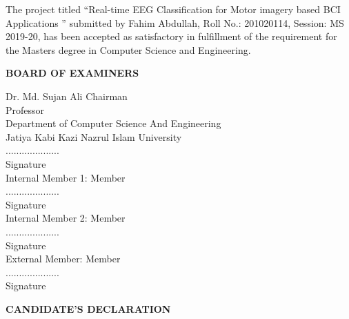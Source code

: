 \documentclass[12pt,a4paper]{report}
\begin{document}
	\onehalfspacing
	\justify The project titled “Real-time EEG Classification for Motor imagery based BCI Applications ” submitted by Fahim Abdullah, Roll No.: 201020114, Session: MS 2019-20, has been accepted as satisfactory in fulfillment of the requirement for the Masters degree in Computer Science and Engineering.
	\vspace{1cm}
	\begin{center}
		\textbf{	\large BOARD OF EXAMINERS}
	\end{center}
	\vspace{1cm}
	
	\justify
	Dr. Md. Sujan Ali   \hspace{8.5cm}   Chairman\\
Professor\\
Department of Computer Science And Engineering\\
Jatiya Kabi Kazi Nazrul Islam University \\
\vspace{1mm}	\justify
....................\\
Signature\\	
	
	\justify
	Internal Member 1:   \hspace{9.4cm}     Member\\  
	\vspace{1cm}
	\justify
	....................\\
	Signature\\
	
	
	
	\justify
	Internal Member 2:   \hspace{9.4cm}     Member\\ 
	\vspace{1cm}
	\justify
	....................\\
	Signature\\
	
	
	
	
	\justify
	External Member:   \hspace{9.5cm}     Member\\  
	\vspace{1cm}
	\justify
	....................\\
	Signature
	
	
	
	\newpage
	
	\begin{center}
		\textbf{	\large CANDIDATE’S DECLARATION}
	\end{center}
	
\end{document}
